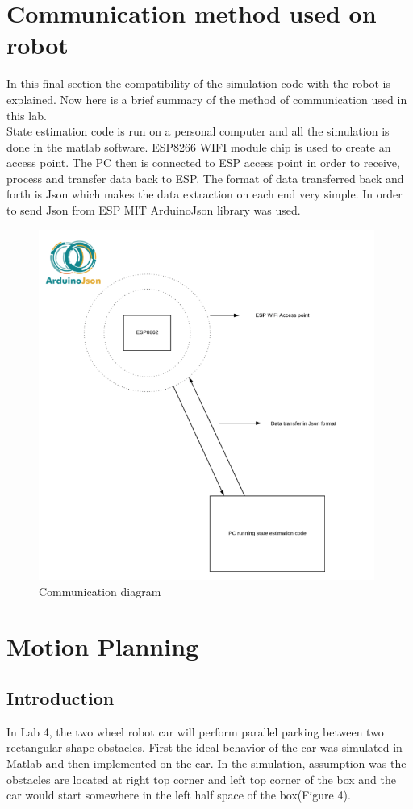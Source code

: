 \documentclass[12pt, letterpaper]{amsart} %
\numberwithin{equation}{section}
\begin{document}
\section{Communication method used on robot}
In this final section the compatibility of the simulation code with the robot is explained. Now here is a brief summary of the method of communication used in this lab. \\ 
State estimation code is run on a personal computer and all the simulation is done in the matlab software. ESP8266 WIFI module chip is used to create an access point. The PC then is connected to ESP access point in order to receive, process and transfer data back to ESP. The format of data transferred back and forth is Json which makes the data extraction on each end very simple. In order to send Json from ESP MIT ArduinoJson library was used. 

\begin{figure}[h!]
\includegraphics[width=110mm]{fig_3.png}
\caption{Communication diagram}
\label{fig:figure3}
\end{figure}

\newpage
\section{Motion Planning}
\subsection{Introduction}
In Lab 4, the two wheel robot car will perform parallel parking between two rectangular shape obstacles. First the ideal behavior of the car was simulated in Matlab and then implemented on the car.
In the simulation, assumption was the obstacles are located at right top corner and left top corner of the box and the car would start somewhere in the left half space of the box(Figure 4).
\end{document}
